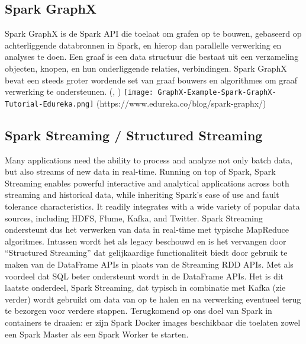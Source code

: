 \autocite{Spark2023b}

\subsection{Spark GraphX}
Spark GraphX is de Spark API die toelaat om grafen op te bouwen, gebaseerd op achterliggende databronnen in Spark, en hierop dan parallelle verwerking en analyses te doen. 
Een graaf is een data structuur die bestaat uit een verzameling objecten, knopen, en hun onderliggende relaties, verbindingen.
Spark GraphX bevat een steeds groter wordende set van graaf bouwers en algorithmes om graaf verwerking te ondersteunen.
(\autocite{Dayananda2019}, \autocite{Wikipedia2023})
\newline
\newline
\texttt{[image: GraphX-Example-Spark-GraphX-Tutorial-Edureka.png]}
(https://www.edureka.co/blog/spark-graphx/)

\subsection{Spark Streaming / Structured Streaming}
Many applications need the ability to process and analyze not only batch data, but also streams of new data in real-time. Running on top of Spark, Spark Streaming enables powerful interactive and analytical applications across both streaming and historical data, while inheriting Spark’s ease of use and fault tolerance characteristics. It readily integrates with a wide variety of popular data sources, including HDFS, Flume, Kafka, and Twitter.\autocite{databricks2023}
\newline
\newline
Spark Streaming ondersteunt dus het verwerken van data in real-time met typische MapReduce algoritmes. Intussen wordt het als legacy beschouwd en is het vervangen door ``Structured Streaming'' dat gelijkaardige functionaliteit biedt door gebruik te maken van de DataFrame APIs in plaats van de Streaming RDD APIs. Met als voordeel dat SQL beter ondersteunt wordt in de DataFrame APIs.
\autocite{Buuck2022}
\newline
\newline
Het is dit laatste onderdeel, Spark Streaming, dat typisch in combinatie met Kafka (zie verder) wordt gebruikt om data van op te halen en na verwerking eventueel terug te bezorgen voor verdere stappen.
\newline
\newline
\newline
Terugkomend op ons doel van Spark in containers te draaien: er zijn Spark Docker images beschikbaar die toelaten zowel een Spark Master als een Spark Worker te starten.


